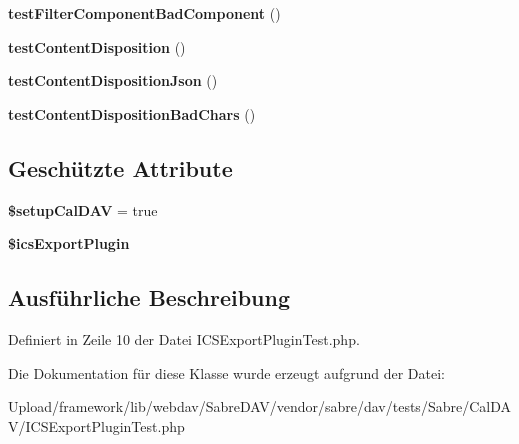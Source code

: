 \begin{DoxyCompactItemize}
\item 
\mbox{\label{class_sabre_1_1_cal_d_a_v_1_1_i_c_s_export_plugin_test_abfd41ce3be07b4f40db842fed3487e53}} 
{\bfseries test\+Filter\+Component\+Bad\+Component} ()
\item 
\mbox{\label{class_sabre_1_1_cal_d_a_v_1_1_i_c_s_export_plugin_test_a0767811bea53c7826c7032528a5e6c95}} 
{\bfseries test\+Content\+Disposition} ()
\item 
\mbox{\label{class_sabre_1_1_cal_d_a_v_1_1_i_c_s_export_plugin_test_ae28596cedfa0ce07515e910581baae82}} 
{\bfseries test\+Content\+Disposition\+Json} ()
\item 
\mbox{\label{class_sabre_1_1_cal_d_a_v_1_1_i_c_s_export_plugin_test_adedd23ea81afa71418b80441248bde73}} 
{\bfseries test\+Content\+Disposition\+Bad\+Chars} ()
\end{DoxyCompactItemize}
\subsection*{Geschützte Attribute}
\begin{DoxyCompactItemize}
\item 
\mbox{\label{class_sabre_1_1_cal_d_a_v_1_1_i_c_s_export_plugin_test_a57c856b626e33ccf8b6522ac3f828a38}} 
{\bfseries \$setup\+Cal\+D\+AV} = true
\item 
\mbox{\label{class_sabre_1_1_cal_d_a_v_1_1_i_c_s_export_plugin_test_a9c1843ac72063a6c5631b44dd94d878a}} 
{\bfseries \$ics\+Export\+Plugin}
\end{DoxyCompactItemize}


\subsection{Ausführliche Beschreibung}


Definiert in Zeile 10 der Datei I\+C\+S\+Export\+Plugin\+Test.\+php.



Die Dokumentation für diese Klasse wurde erzeugt aufgrund der Datei\+:\begin{DoxyCompactItemize}
\item 
Upload/framework/lib/webdav/\+Sabre\+D\+A\+V/vendor/sabre/dav/tests/\+Sabre/\+Cal\+D\+A\+V/I\+C\+S\+Export\+Plugin\+Test.\+php\end{DoxyCompactItemize}
